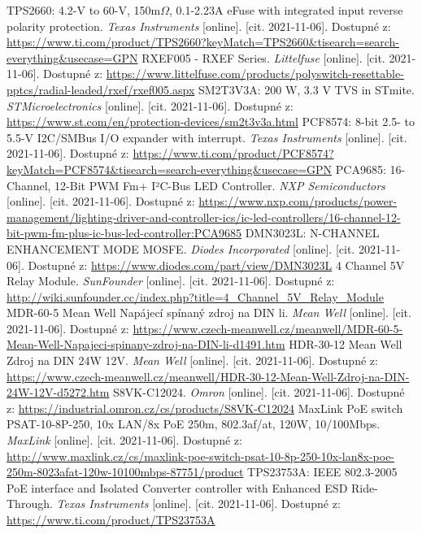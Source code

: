 \begin{thebibliography}{3}
TPS2660: 4.2-V to 60-V, 150m$\Omega$, 0.1-2.23A eFuse with integrated input reverse polarity protection. \textit{Texas Instruments} [online]. [cit. 2021-11-06]. Dostupné z: \url{https://www.ti.com/product/TPS2660?keyMatch=TPS2660&tisearch=search-everything&usecase=GPN}
RXEF005 - RXEF Series. \textit{Littelfuse} [online]. [cit. 2021-11-06]. Dostupné z: \url{https://www.littelfuse.com/products/polyswitch-resettable-pptcs/radial-leaded/rxef/rxef005.aspx}
SM2T3V3A: 200 W, 3.3 V TVS in STmite. \textit{STMicroelectronics} [online]. [cit. 2021-11-06]. Dostupné z: \url{https://www.st.com/en/protection-devices/sm2t3v3a.html}
PCF8574: 8-bit 2.5- to 5.5-V I2C/SMBus I/O expander with interrupt. \textit{Texas Instruments} [online]. [cit. 2021-11-06]. Dostupné z: \url{https://www.ti.com/product/PCF8574?keyMatch=PCF8574&tisearch=search-everything&usecase=GPN}
PCA9685: 16-Channel, 12-Bit PWM Fm+ I²C-Bus LED Controller. \textit{NXP Semiconductors} [online]. [cit. 2021-11-06]. Dostupné z: \url{https://www.nxp.com/products/power-management/lighting-driver-and-controller-ics/ic-led-controllers/16-channel-12-bit-pwm-fm-plus-ic-bus-led-controller:PCA9685}
DMN3023L: N-CHANNEL ENHANCEMENT MODE MOSFE. \textit{Diodes Incorporated} [online]. [cit. 2021-11-06]. Dostupné z: \url{https://www.diodes.com/part/view/DMN3023L}
4 Channel 5V Relay Module. \textit{SunFounder} [online]. [cit. 2021-11-06]. Dostupné z: \url{http://wiki.sunfounder.cc/index.php?title=4_Channel_5V_Relay_Module}
MDR-60-5 Mean Well Napájecí spínaný zdroj na DIN li. \textit{Mean Well} [online]. [cit. 2021-11-06]. Dostupné z: \url{https://www.czech-meanwell.cz/meanwell/MDR-60-5-Mean-Well-Napajeci-spinany-zdroj-na-DIN-li-d1491.htm}
HDR-30-12 Mean Well Zdroj na DIN 24W 12V. \textit{Mean Well} [online]. [cit. 2021-11-06]. Dostupné z: \url{https://www.czech-meanwell.cz/meanwell/HDR-30-12-Mean-Well-Zdroj-na-DIN-24W-12V-d5272.htm}
S8VK-C12024. \textit{Omron} [online]. [cit. 2021-11-06]. Dostupné z: \url{https://industrial.omron.cz/cs/products/S8VK-C12024}
MaxLink PoE switch PSAT-10-8P-250, 10x LAN/8x PoE 250m, 802.3af/at, 120W, 10/100Mbps. \textit{MaxLink} [online]. [cit. 2021-11-06]. Dostupné z: \url{http://www.maxlink.cz/cs/maxlink-poe-switch-psat-10-8p-250-10x-lan8x-poe-250m-8023afat-120w-10100mbps-87751/product}
TPS23753A: IEEE 802.3-2005 PoE interface and Isolated Converter controller with Enhanced ESD Ride-Through. \textit{Texas Instruments} [online]. [cit. 2021-11-06]. Dostupné z: \url{https://www.ti.com/product/TPS23753A}

\end{thebibliography}

